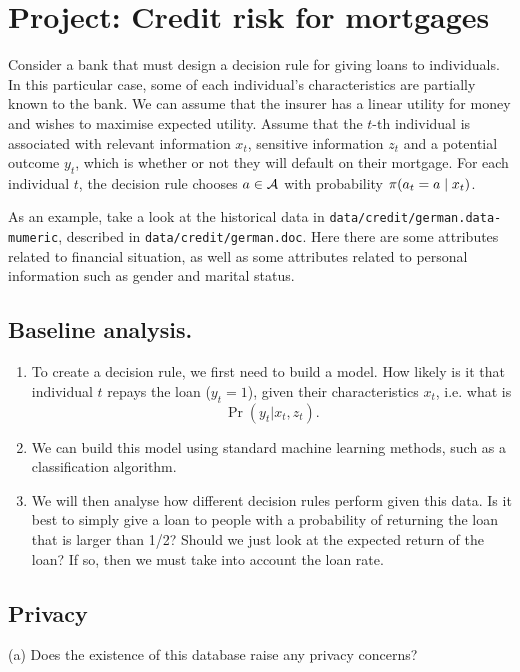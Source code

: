 \section{Project: Credit risk for mortgages}

Consider a bank that must design a decision rule for giving loans to
individuals. In this particular case, some of each individual's
characteristics are partially known to the bank.  We can assume that
the insurer has a linear utility for money and wishes to maximise
expected utility. Assume that the $t$-th individual is associated with
relevant information $x_t$, sensitive information $z_t$ and a
potential outcome $y_t$, which is whether or not they will default on
their mortgage. For each individual $t$, the decision rule chooses
$a \in {\mathcal{A}}$ with probability $\pi(a_t = a \mid x_t)$.

As an example, take a look at the historical data in
\texttt{data/credit/german.data-mumeric}, described in
\texttt{data/credit/german.doc}. Here there are some attributes
related to financial situation, as well as some attributes related to
personal information such as gender and marital status.

\subsection{Baseline analysis.}
\begin{enumerate}
\item To create a decision rule, we first need to build a model. How
  likely is it that individual $t$ repays the loan ($y_t = 1$), given
  their characteristics $x_t$, i.e. what is
  \[
    \Pr(y_t | x_t, z_t).
  \]
\item We can build this model using standard machine learning methods,
  such as a classification algorithm.
\item We will then analyse how different decision rules perform given
  this data. Is it best to simply give a loan to people with a
  probability of returning the loan that is larger than 1/2? Should we just look at the expected return of the loan? If so, then we must take into account the loan rate.
\end{enumerate}

\subsection{Privacy}
(a) Does the existence of this database raise any privacy concerns?

